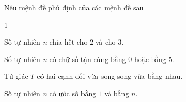 \begin{bt}%
	Nêu mệnh đề phủ định của các mệnh đề sau 
	\begin{enumEX}{1}
		\item Số tự  nhiên $n$ chia hết cho $2$ và cho $3$.
		\item Số tự nhiên $n$ có chữ số tận cùng bằng $0$ hoặc  bằng $5$.
		\item Tứ giác $T$ có hai cạnh đối vừa  song song vừa bằng nhau.
		\item Số tự nhiên $n$ có ước số bằng $1$ và bằng  $n$.
	\end{enumEX}
\end{bt}

